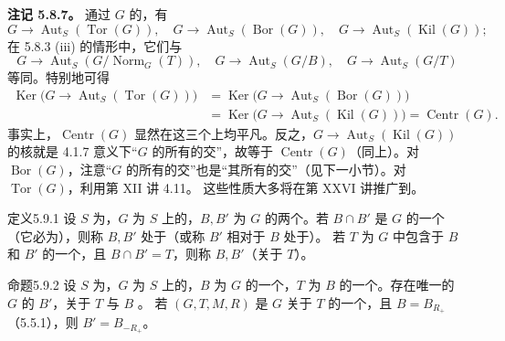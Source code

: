 \textbf{注记 5.8.7。} 通过 $G$ 的，有
\[G\to\operatorname{Aut}_S(\operatorname{Tor}(G)),\quad
G\to\operatorname{Aut}_S(\operatorname{Bor}(G)),\quad
G\to\operatorname{Aut}_S(\operatorname{Kil}(G));\]
在 5.8.3 (iii) 的情形中，它们与
\[G\to\operatorname{Aut}_S(G/\operatorname{Norm}_G(T)),\quad G\to\operatorname{Aut}_S(G/B),\quad G\to\operatorname{Aut}_S(G/T)\]
等同。特别地可得
\[\begin{split}
\operatorname{Ker}\bigl(G\to\operatorname{Aut}_S(\operatorname{Tor}(G))\bigr)
&=\operatorname{Ker}\bigl(G\to\operatorname{Aut}_S(\operatorname{Bor}(G))\bigr)\\
&=\operatorname{Ker}\bigl(G\to\operatorname{Aut}_S(\operatorname{Kil}(G))\bigr)
=\operatorname{Centr}(G).
\end{split}\]
事实上，$\operatorname{Centr}(G)$ 显然在这三个上均平凡。反之，$G\to\operatorname{Aut}_S(\operatorname{Kil}(G))$ 的核就是 4.1.7 意义下“$G$ 的所有的交”，故等于 $\operatorname{Centr}(G)$（同上）。对 $\operatorname{Bor}(G)$，注意“$G$ 的所有的交”也是“其所有的交”（见下一小节）。对 $\operatorname{Tor}(G)$，利用第 XII 讲 4.11。
这些性质大多将在第 XXVI 讲推广到。
\begin{SGAresult}{定义}{5.9.1}
设 $S$ 为，$G$ 为 $S$ 上的，$B,B'$ 为 $G$ 的两个。若 $B\cap B'$ 是 $G$ 的一个（它必为），则称 $B,B'$ 处于（或称 $B'$ 相对于 $B$ 处于）。
若 $T$ 为 $G$ 中包含于 $B$ 和 $B'$ 的一个，且 $B\cap B'=T$，则称 $B,B'$（关于 $T$）。
\end{SGAresult}
\begin{SGAresult}{命题}{5.9.2}
设 $S$ 为，$G$ 为 $S$ 上的，$B$ 为 $G$ 的一个，$T$ 为 $B$ 的一个。存在唯一的 $G$ 的 $B'$，关于 $T$ 与 $B$ 。
若 $(G,T,M,R)$ 是 $G$ 关于 $T$ 的一个，且 $B=B_{R_+}$（5.5.1），则 $B'=B_{-R_+}$。
\end{SGAresult}
